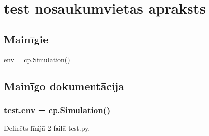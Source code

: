 \hypertarget{namespacetest}{}\section{test nosaukumvietas apraksts}
\label{namespacetest}
\subsection*{Mainīgie}
\begin{DoxyCompactItemize}
\item 
\hyperlink{namespacetest_a74516914e67fa722920a168029a4be21}{env} = cp.\+Simulation()
\end{DoxyCompactItemize}


\subsection{Mainīgo dokumentācija}
\subsubsection[{\texorpdfstring{env}{env}}]{\setlength{\rightskip}{0pt plus 5cm}test.\+env = cp.\+Simulation()}\hypertarget{namespacetest_a74516914e67fa722920a168029a4be21}{}\label{namespacetest_a74516914e67fa722920a168029a4be21}


Definēts līnijā 2 failā test.\+py.

